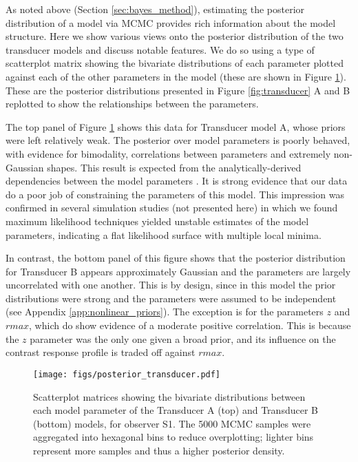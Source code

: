 \documentclass[11pt,a4paper]{article}
\begin{document}
As noted above (Section \ref{sec:bayes_method}), estimating the posterior distribution of a model via MCMC provides rich information about the model structure.
Here we show various views onto the posterior distribution of the two transducer models and discuss notable features.
We do so using a type of scatterplot matrix showing the bivariate distributions of each parameter plotted against each of the other parameters in the model (these are shown in Figure \ref{fig:posterior_transducer}).
These are the posterior distributions presented in Figure \ref{fig:transducer} A and B replotted to show the relationships between the parameters.

The top panel of Figure \ref{fig:posterior_transducer} shows this data for Transducer model A, whose priors were left relatively weak.
The posterior over model parameters is poorly behaved, with evidence for bimodality, correlations between parameters and extremely non-Gaussian shapes.
This result is expected from the analytically-derived dependencies between the model parameters \citep{Yu2003,Haun2009}.
It is strong evidence that our data do a poor job of constraining the parameters of this model.
This impression was confirmed in several simulation studies (not presented here) in which we found maximum likelihood techniques yielded unstable estimates of the model parameters, indicating a flat likelihood surface with multiple local minima.

In contrast, the bottom panel of this figure shows that the posterior distribution for Transducer B appears approximately Gaussian and the parameters are largely uncorrelated with one another.
This is by design, since in this model the prior distributions were strong and the parameters were assumed to be independent (see Appendix \ref{app:nonlinear_priors}).
The exception is for the parameters $z$ and $rmax$, which do show evidence of a moderate positive correlation.
This is because the $z$ parameter was the only one given a broad prior, and its influence on the contrast response profile is traded off against $rmax$.


\begin{figure}[H]
\begin{center}
\texttt{[image: figs/posterior\_transducer.pdf]}
\end{center}
\caption{
Scatterplot matrices showing the bivariate distributions between each model parameter of the Transducer A (top) and Transducer B (bottom) models, for observer S1.
The 5000 MCMC samples were aggregated into hexagonal bins to reduce overplotting; lighter bins represent more samples and thus a higher posterior density.
}
\label{fig:posterior_transducer}
\end{figure}
\end{document}
